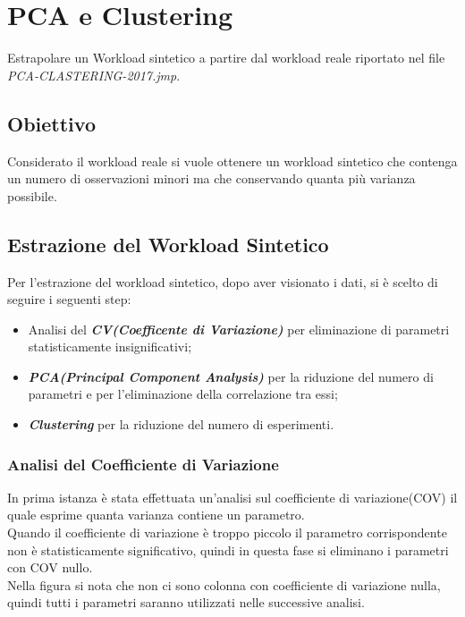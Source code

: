 
\chapter{PCA e Clustering}
Estrapolare un Workload sintetico a partire dal workload reale riportato nel file
 \textit{PCA-CLASTERING-2017.jmp}.

\section{Obiettivo}
Considerato il workload reale si vuole ottenere un workload sintetico
che contenga un numero di osservazioni minori ma che conservando quanta
più varianza possibile.

\section{Estrazione del Workload Sintetico}
Per l'estrazione del workload sintetico, dopo aver visionato i dati, si è scelto
di seguire i seguenti step:

\begin{itemize}
  \item Analisi del \textbf{\textit{CV(Coefficente di Variazione)}} per
  eliminazione di parametri statisticamente insignificativi;
  \item \textbf{\textit{PCA(Principal Component Analysis)}} per la riduzione del
  numero di parametri e per l'eliminazione della correlazione tra essi;
  \item \textbf{\textit{Clustering}} per la riduzione del numero di esperimenti.
\end{itemize}


\subsection{Analisi del Coefficiente di Variazione}
In prima istanza è stata effettuata un'analisi sul coefficiente di variazione(COV)
il quale esprime quanta varianza contiene un parametro.\\
Quando il coefficiente di variazione è troppo piccolo il parametro corrispondente
non è statisticamente significativo, quindi in questa fase si eliminano i parametri
con COV nullo.\\
Nella figura si nota che non ci sono colonna con coefficiente di variazione nulla,
quindi tutti i parametri saranno utilizzati nelle successive analisi.


